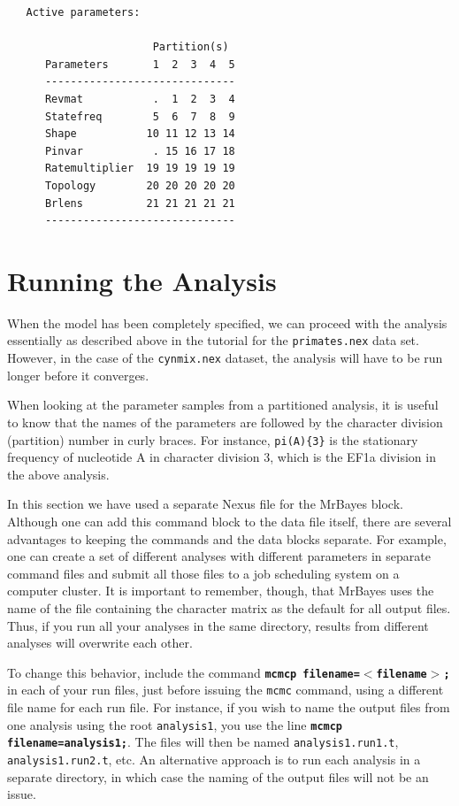 \documentclass[12pt]{book}
\newcommand{\ttt}[1]{\texttt{#1}}
\newcommand{\tb}[1]{\ttt{\textbf{#1}}}
\begin{document}
\begin{singlespacing}
\footnotesize
\begin{verbatim}
   Active parameters:
 
                       Partition(s)
      Parameters       1  2  3  4  5
      ------------------------------
      Revmat           .  1  2  3  4
      Statefreq        5  6  7  8  9
      Shape           10 11 12 13 14
      Pinvar           . 15 16 17 18
      Ratemultiplier  19 19 19 19 19
      Topology        20 20 20 20 20
      Brlens          21 21 21 21 21
      ------------------------------
\end{verbatim}
\normalsize
\end{singlespacing}

\section{Running the Analysis}

When the model has been completely specified, we can proceed with the analysis essentially as
described above in the tutorial for the \ttt{primates.nex} data set. However, in the case of the
\ttt{cynmix.nex} dataset, the analysis will have to be run longer before it converges.

When looking at the parameter samples from a partitioned analysis, it is useful to know that the
names of the parameters are followed by the character division (partition) number in curly braces.
For instance, \ttt{pi(A)\{3\}} is the stationary frequency of nucleotide A in character division 3,
which is the EF1a division in the above analysis.

In this section we have used a separate Nexus file for the MrBayes block. Although one can add this
command block to the data file itself, there are several advantages to keeping the commands and the
data blocks separate. For example, one can create a set of different analyses with different
parameters in separate command files and submit all those files to a job scheduling system on a
computer cluster. It is important to remember, though, that MrBayes uses the name of the file
containing the character matrix as the default for all output files. Thus, if you run all your
analyses in the same directory, results from different analyses will overwrite each other.

To change this behavior, include the command \tb{mcmcp filename=$<$filename$>$;} in each of your
run files, just before issuing the \ttt{mcmc} command, using a different file name for each run
file. For instance, if you wish to name the output files from one analysis using the root
\ttt{analysis1}, you use the line \tb{mcmcp filename=analysis1;}. The files will then be named
\ttt{analysis1.run1.t}, \ttt{analysis1.run2.t}, etc. An alternative approach is to run each
analysis in a separate directory, in which case the naming of the output files will not be an
issue.
\end{document}
